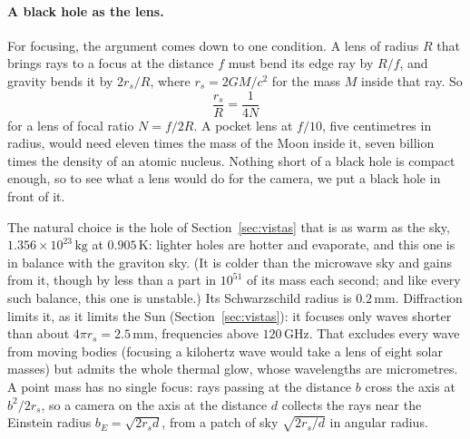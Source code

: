 \paragraph{A black hole as the lens.} For focusing, the argument comes
down to one condition. A lens of radius $R$ that brings rays to a focus at the
distance $f$ must bend its edge ray by $R/f$, and gravity bends it by $2r_s/R$,
where $r_s = 2GM/c^2$ for the mass $M$ inside that ray. So
\begin{equation}\label{eq:lens-compactness}
\frac{r_s}{R} = \frac{1}{4N}
\end{equation}
for a lens of focal ratio $N = f/2R$. A pocket lens at $f/10$, five centimetres
in radius, would need eleven times the mass of the Moon inside it, seven billion
times the density of an atomic nucleus. Nothing short of a black hole is
compact enough, so to see what a lens would do for the camera, we put a black
hole in front of it.

The natural choice is the hole of Section~\ref{sec:vistas} that is as warm as
the sky, $1.356\times10^{23}\,\mathrm{kg}$ at $0.905\,\mathrm{K}$: lighter holes are
hotter and evaporate, and this one is in balance with the graviton sky. (It is
colder than the microwave sky and gains from it, though by less than a part in
$10^{51}$ of its mass each second; and like every such balance, this one is
unstable.) Its
Schwarzschild radius is $0.2\,\mathrm{mm}$. Diffraction limits it, as it limits
the Sun (Section~\ref{sec:vistas}): it focuses only waves shorter than about $4\pi r_s = 2.5\,\mathrm{mm}$,
frequencies above $120\,\mathrm{GHz}$. That excludes every wave from moving
bodies (focusing a kilohertz wave would take a lens of eight solar masses) but
admits the whole thermal glow, whose wavelengths are micrometres. A point mass has
no single focus: rays passing at the distance $b$ cross the axis at
$b^2/2r_s$, so a camera on the axis at the distance $d$ collects the rays near
the Einstein radius $b_E = \sqrt{2 r_s d}$, from a patch of sky
$\sqrt{2r_s/d}$ in angular radius.

